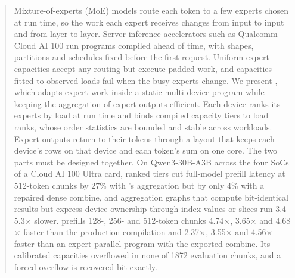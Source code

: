 \begin{abstract}
Mixture-of-experts (MoE) models route each token to a few experts chosen at run time, so the work each expert receives
changes from input to input and from layer to layer. Server inference accelerators such as Qualcomm Cloud AI 100 run
programs compiled ahead of time, with shapes, partitions and schedules fixed before the first request. Uniform expert
capacities accept any routing but execute padded work, and capacities fitted to observed loads fail when the busy experts
change. We present \sys, which adapts expert work inside a static multi-device program while keeping the aggregation of
expert outputs efficient. Each device ranks its experts by load at run time and binds compiled capacity tiers to load
ranks, whose order statistics are bounded and stable across workloads. Expert outputs return to their tokens through a
layout that keeps each device's rows on that device and each token's sum on one core. The two parts must be designed
together. On Qwen3-30B-A3B across the four SoCs of a Cloud AI 100 Ultra card, ranked tiers cut full-model prefill latency
at 512-token chunks by 27\% with \sys's aggregation but by only 4\% with a repaired dense combine, and aggregation graphs
that compute bit-identical results but express device ownership through index values or slices run 3.4--5.3$\times$
slower. \sys prefills 128-, 256- and 512-token chunks 4.74$\times$, 3.65$\times$ and 4.68$\times$ faster than the production compilation
and 2.37$\times$, 3.55$\times$ and 4.56$\times$ faster than an expert-parallel program with the exported combine. Its
calibrated capacities overflowed in none of 1872 evaluation chunks, and a forced overflow is recovered bit-exactly.
\end{abstract}
